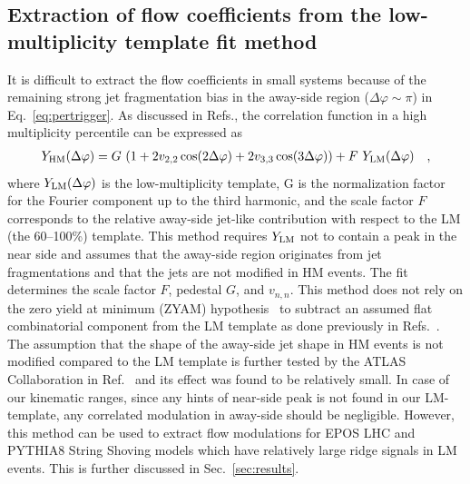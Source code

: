\subsection{Extraction of flow coefficients from the low-multiplicity template fit method}

It is difficult to extract the flow coefficients in small systems because of the remaining strong jet fragmentation bias in the away-side region ($\Delta\varphi \sim \pi$) in Eq.~\ref{eq:pertrigger}. As discussed in Refs.\cite{ATLAS:2015hzw,ATLAS:2016yzd}, the correlation function in a high multiplicity percentile can be expressed as 
\begin{eqnarray}
Y_{\rm{HM}}(\Delta\varphi) = G~(1 + 2v_{2,2}\cos(2\Delta\varphi) + 2v_{3,3}\cos(3\Delta\varphi)) + F~Y_{\rm{LM}}(\Delta\varphi) \quad,
\end{eqnarray}
where $Y_{\rm{LM}}(\Delta\varphi)$ is the low-multiplicity template, G is the normalization factor for the Fourier component up to the third harmonic, and the scale factor $F$ corresponds to the relative away-side jet-like contribution with respect to the LM (the 60--100\%) template. This method requires $Y_{\rm{LM}}$ not to contain a peak in the near side and assumes that the away-side region originates from jet fragmentations and that the jets are not modified in HM events. The fit determines the scale factor $F$, pedestal $G$, and $v_{n,n}$. This method does not rely on the zero yield at minimum (ZYAM) hypothesis~\cite{Ajitanand:2005jj} to subtract an assumed flat combinatorial component from the LM template as done previously in Refs.~\cite{ATLAS:2012cix,ATLAS:2014qaj}. The assumption that the shape of the away-side jet shape in HM events is not modified compared to the LM template is further tested by the ATLAS Collaboration in Ref.~\cite{ATLAS:2018ngv} and its effect was found to be relatively small. In case of our kinematic ranges, since any hints of near-side peak is not found in our LM-template, any correlated modulation in away-side should be negligible. However, this method can be used to extract flow modulations for EPOS LHC and PYTHIA8 String Shoving models which have relatively large ridge signals in LM events. This is further discussed in Sec.~\ref{sec:results}.


